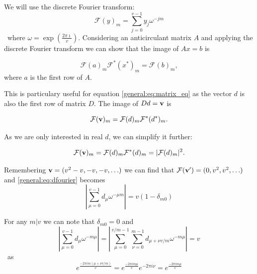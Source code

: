     We will use the discrete Fourier transform:
    \begin{equation}
        \mathcal F (y)_m = \sum_{j=0}^{v-1} y_j \omega^{-jm}
    \end{equation}\
    where $\omega = \exp(\frac{2\pi \imath}v)$. Considering an anticirculant matrix $A$ and applying the discrete Fourier transform we can show that the image of $Ax=b$ is
    
    \begin{equation}
        \label{general:eq:fourier_image}
        \mathcal F (a)_m \mathcal F ^*(x^*)_m = \mathcal F (b)_m,
    \end{equation}
    where $a$ is the first row of $A$.
    
    This is particulary useful for equation \eqref{general:eq:matrix_eq} as the vector $d$ is also the first row of matrix $D$. The image of $Dd=\bf v$ is
    
    \begin{equation}
        \mathcal{F} ({\bf v})_m = \mathcal{F}(d)_m \mathcal{F^*}(d^*)_m.
    \end{equation}

    As we are only interested in real $d$, we can simplify it further:
    
    \begin{equation}
        \label{general:eq:dfourier}
        \mathcal{F} ({\bf v})_m = \mathcal{F}(d)_m \mathcal{F^*}(d)_m = |\mathcal{F}(d)_m|^2.
    \end{equation}
    
    Remembering ${\bf v} = (v^2-v, -v, -v, \ldots)$ we can find that $\mathcal{F}({\bf v'}) = (0,v^2,v^2,\ldots)$ and \eqref{general:eq:dfourier} becomes
    \begin{equation}
        \label{gen:eq:dfourierfinal}
        \left| \sum_{\mu=0}^{v-1} d_\mu \omega^{-\mu m} \right| = v (1-\delta_{m0})
    \end{equation}

    For any $m | v$ we can note that $\delta_{m0}=0$ and
    \begin{equation}
        \label{general:eq:split_fourier}
        \left| \sum_{\mu=0}^{v-1} d_\mu \omega^{-m\mu} \right|
        = \left| \sum_{\mu=0}^{v/m-1} \sum_{\nu=0}^{m-1}  d_{\mu+\nu v/m} \omega^{-m\mu} \right|
        =v
    \end{equation}\
    as 
    \begin{equation}
        e^{\frac{-2\pi i m (\mu+\nu v/m)}v} = e^{\frac{-2\pi i m \mu}v} e^{-2\pi i \nu} = e^{\frac{-2\pi i m \mu}v}
    \end{equation}
    
